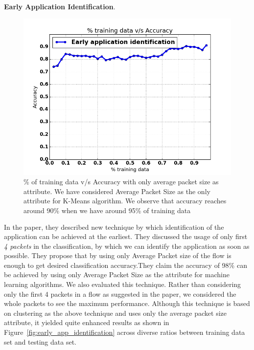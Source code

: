 \documentclass[conference]{IEEEtran}
\begin{document}
\textbf{Early Application Identification}.\cite{Bernaille:2006:EAI:1368436.1368445}
\begin{figure}[!t]
	\centering
	\includegraphics[width=1\columnwidth]{early_application_result}
	\caption{\% of training data v/s Accuracy with only average packet size as attribute. We have considered Average Packet Size as the only attribute for K-Means algorithm. We observe that accuracy reaches around 90\% when we have around 95\% of training data}
	\label{early_app_identification}
\end{figure}
In the paper\cite{Bernaille:2006:EAI:1368436.1368445}, they described new technique by which identification of the application can be achieved at the earliest. They discussed the usage of only first \textit{4 packets} in the classification, by which we can identify the application as soon as possible. They propose that by using only Average Packet size of the flow is enough to get desired classification accuracy.They claim the accuracy of 98\% can be achieved by using only Average Packet Size  as the attribute for machine learning algorithms.
We also evaluated this technique. Rather than considering only the first 4 packets in a flow as suggested in the paper, we considered the whole packets to see the maximum performance.
Although this technique is based on clustering as the above technique and uses only the average packet size attribute, it yielded quite enhanced results as shown in Figure~\ref{fig:early_app_identification} across diverse ratios between training data set and testing data set. 
\end{document}
